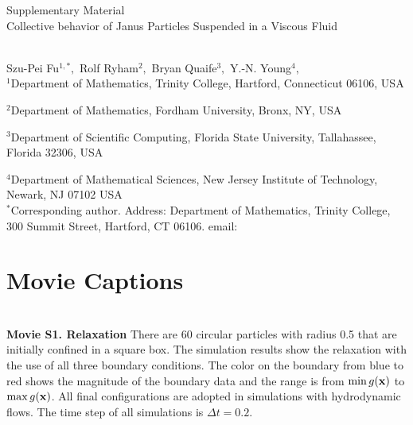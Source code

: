 
\thispagestyle{empty}

\newpage
{\Large \bf

  \noindent Supplementary Material\\

  \noindent 
  Collective behavior of Janus Particles  Suspended in a Viscous Fluid}\\

\noindent 
Szu-Pei Fu$^{1,*},$ 
Rolf Ryham$^{2},$ 
Bryan Quaife$^{3},$ 
Y.-N. Young$^{4},$
\\

\noindent
$^{1}$Department of Mathematics, Trinity College, Hartford, Connecticut 06106, USA

\noindent
$^{2}$Department of Mathematics, Fordham University,  Bronx, NY, USA

\noindent
$^{3}$Department of Scientific Computing, Florida State University, Tallahassee, Florida 32306, USA

\noindent
$^{4}$Department of Mathematical Sciences, New Jersey Institute of Technology, Newark, NJ  07102 USA
\\

\noindent $^*$Corresponding author. Address: Department of Mathematics, Trinity College, 
300 Summit Street, Hartford, CT 06106. email: 



\setcounter{page}{1}

\setcounter{figure}{0}
\renewcommand{\thefigure}{S\arabic{figure}}

\setcounter{equation}{0}
\renewcommand{\theequation}{S\arabic{equation}}

\setcounter{section}{0}
\renewcommand{\thesection}{S\arabic{section}}   





\sloppy
\section{Movie Captions}\mbox{} \\

\noindent
{\bf Movie S1. Relaxation} 
There are 60 circular particles with radius 0.5 that are initially confined in a square box.
The simulation results show the relaxation with the use of all three boundary conditions.
The color on the boundary from blue to red shows the magnitude of the boundary data and 
the range is from $\min g(\mathbf{x})$ to $\max g(\mathbf{x})$. All final configurations are adopted in 
simulations with hydrodynamic flows. The time step of all simulations is $\Delta t=0.2$.\\


